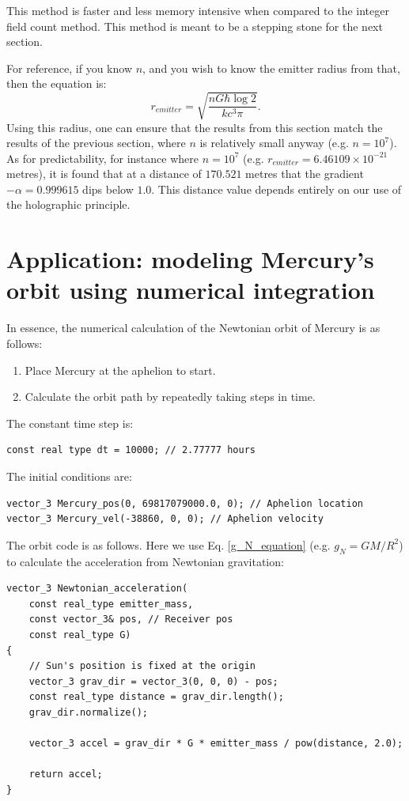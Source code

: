 \documentclass[12pt]{article}
\begin{document}
This method is faster and less memory intensive when compared to the integer field count method.
This method is meant to be a stepping stone for the next section.

For reference, if you know $n$, and you wish to know the emitter radius from that, then the equation is:
\begin{equation}
r_{\textit{emitter}} = \sqrt{\frac{n G \hbar \log 2}{k c^3 \pi}}.
\end{equation}
Using this radius, one can ensure that the results from this section match the results of the previous section, where $n$ is relatively small anyway (e.g. $n = 10^7$).
As for predictability, for instance where $n = 10^7$ (e.g. $r_{\textit{emitter}} = 6.46109 \times 10^{-21}$ metres), it is found that at a distance of $170.521$ metres that the gradient $-\alpha = 0.999615$ dips below $1.0$.
This distance value depends entirely on our use of the holographic principle.




\section{Application: modeling Mercury's orbit using numerical integration}

In essence, the numerical calculation of the Newtonian orbit of Mercury is as follows:
\begin{enumerate}
\item Place Mercury at the aphelion to start.
\item Calculate the orbit path by repeatedly taking steps in time.
\end{enumerate}

The constant time step is:
\begin{lstlisting}
const real type dt = 10000; // 2.77777 hours
\end{lstlisting}

The initial conditions are:
\begin{lstlisting}
vector_3 Mercury_pos(0, 69817079000.0, 0); // Aphelion location
vector_3 Mercury_vel(-38860, 0, 0); // Aphelion velocity
\end{lstlisting}

The orbit code is as follows. 
Here we use Eq. \ref{g_N_equation} (e.g. $g_N = {G M}/{R^2}$) to calculate the acceleration from Newtonian gravitation:
\begin{lstlisting}
vector_3 Newtonian_acceleration(
	const real_type emitter_mass,
	const vector_3& pos, // Receiver pos
	const real_type G)
{
	// Sun's position is fixed at the origin
	vector_3 grav_dir = vector_3(0, 0, 0) - pos;
	const real_type distance = grav_dir.length();
	grav_dir.normalize();

	vector_3 accel = grav_dir * G * emitter_mass / pow(distance, 2.0);

	return accel;
}
\end{lstlisting}
\end{document}
